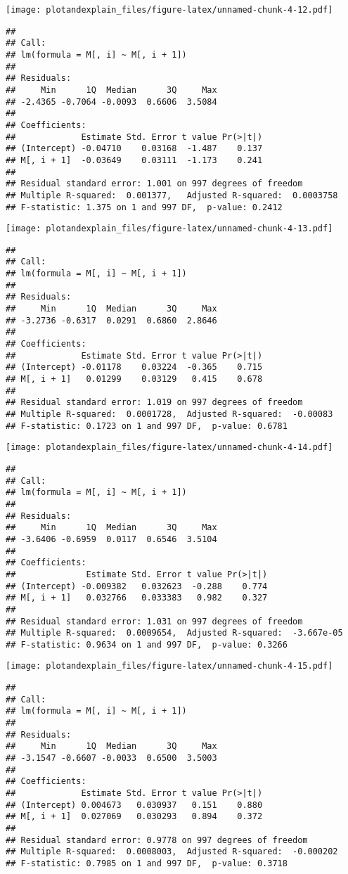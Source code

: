 \documentclass[]{article}
\begin{document}
\texttt{[image: plotandexplain\_files/figure-latex/unnamed-chunk-4-12.pdf]}

\begin{verbatim}
## 
## Call:
## lm(formula = M[, i] ~ M[, i + 1])
## 
## Residuals:
##     Min      1Q  Median      3Q     Max 
## -2.4365 -0.7064 -0.0093  0.6606  3.5084 
## 
## Coefficients:
##             Estimate Std. Error t value Pr(>|t|)
## (Intercept) -0.04710    0.03168  -1.487    0.137
## M[, i + 1]  -0.03649    0.03111  -1.173    0.241
## 
## Residual standard error: 1.001 on 997 degrees of freedom
## Multiple R-squared:  0.001377,   Adjusted R-squared:  0.0003758 
## F-statistic: 1.375 on 1 and 997 DF,  p-value: 0.2412
\end{verbatim}

\texttt{[image: plotandexplain\_files/figure-latex/unnamed-chunk-4-13.pdf]}

\begin{verbatim}
## 
## Call:
## lm(formula = M[, i] ~ M[, i + 1])
## 
## Residuals:
##     Min      1Q  Median      3Q     Max 
## -3.2736 -0.6317  0.0291  0.6860  2.8646 
## 
## Coefficients:
##             Estimate Std. Error t value Pr(>|t|)
## (Intercept) -0.01178    0.03224  -0.365    0.715
## M[, i + 1]   0.01299    0.03129   0.415    0.678
## 
## Residual standard error: 1.019 on 997 degrees of freedom
## Multiple R-squared:  0.0001728,  Adjusted R-squared:  -0.00083 
## F-statistic: 0.1723 on 1 and 997 DF,  p-value: 0.6781
\end{verbatim}

\texttt{[image: plotandexplain\_files/figure-latex/unnamed-chunk-4-14.pdf]}

\begin{verbatim}
## 
## Call:
## lm(formula = M[, i] ~ M[, i + 1])
## 
## Residuals:
##     Min      1Q  Median      3Q     Max 
## -3.6406 -0.6959  0.0117  0.6546  3.5104 
## 
## Coefficients:
##              Estimate Std. Error t value Pr(>|t|)
## (Intercept) -0.009382   0.032623  -0.288    0.774
## M[, i + 1]   0.032766   0.033383   0.982    0.327
## 
## Residual standard error: 1.031 on 997 degrees of freedom
## Multiple R-squared:  0.0009654,  Adjusted R-squared:  -3.667e-05 
## F-statistic: 0.9634 on 1 and 997 DF,  p-value: 0.3266
\end{verbatim}

\texttt{[image: plotandexplain\_files/figure-latex/unnamed-chunk-4-15.pdf]}

\begin{verbatim}
## 
## Call:
## lm(formula = M[, i] ~ M[, i + 1])
## 
## Residuals:
##     Min      1Q  Median      3Q     Max 
## -3.1547 -0.6607 -0.0033  0.6500  3.5003 
## 
## Coefficients:
##             Estimate Std. Error t value Pr(>|t|)
## (Intercept) 0.004673   0.030937   0.151    0.880
## M[, i + 1]  0.027069   0.030293   0.894    0.372
## 
## Residual standard error: 0.9778 on 997 degrees of freedom
## Multiple R-squared:  0.0008003,  Adjusted R-squared:  -0.000202 
## F-statistic: 0.7985 on 1 and 997 DF,  p-value: 0.3718
\end{verbatim}
\end{document}
